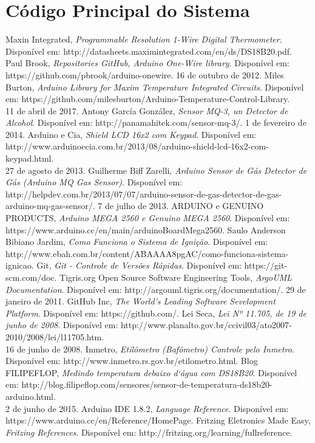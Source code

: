 \documentclass[12pt]{article}
\begin{document}
\section{Código Principal do Sistema}


\begin{thebibliography}{9}

  Maxin Integrated, \emph{Programmable Resolution 1-Wire Digital Thermometer}. Disponível em:
  http://datasheets.maximintegrated.com/en/ds/DS18B20.pdf.
  Paul Brook, \emph{Repositories GitHub, Arduino One-Wire library}. Disponível em:
  https://github.com/pbrook/arduino-onewire. 16 de outubro de 2012.
 Miles Burton, \emph{Arduino Library for Maxim Temperature Integrated Circuits}. Disponível em:
  https://github.com/milesburton/Arduino-Temperature-Control-Library.\\ 11 de abril de 2017.
  Antony García González, \emph{Sensor MQ-3, un Detector de Alcohol}. Disponível em:
  http://panamahitek.com/sensor-mq-3/. 1 de fevereiro de 2014.
  Arduino e Cia, \emph{Shield LCD 16x2 com Keypad}. Disponível em:
  http://www.arduinoecia.com.br/2013/08/arduino-shield-lcd-16x2-com-keypad.html. \\ 27 de agosto de 2013.
  Guilherme Biff Zarelli, \emph{Arduino Sensor de Gás Detector de Gás (Arduino MQ Gas Sensor)}. Disponível em:
  http://helpdev.com.br/2013/07/07/arduino-sensor-de-gas-detector-de-gas-arduino-mq-gas-sensor/. 7 de julho de 2013.
  ARDUINO e GENUINO PRODUCTS, \emph{Arduino MEGA 2560 e Genuino MEGA 2560}. Disponível em:
  https://www.arduino.cc/en/main/arduinoBoardMega2560.
  Saulo Anderson Bibiano Jardim, \emph{Como Funciona o Sistema de Ignição}. Disponível em:
  http://www.ebah.com.br/content/ABAAAA8pgAC/como-funciona-sistema-ignicao.
  Git, \emph{Git - Controle de Versões Rápidas}. Disponível em:
  https://git-scm.com/doc.
  Tigris.org Open Source Software Engineering Tools, \emph{ArgoUML Documentation}. Disponível em:
 http://argouml.tigris.org/documentation/. 29 de janeiro de 2011.
  GitHub Inc, \emph{The World's Leading Software Sevelopment Platform}. Disponível em:
 https://github.com/.
  Lei Seca, \emph{Lei Nº 11.705, de 19 de junho de 2008}. Disponível em:
 http://www.planalto.gov.br/ccivil03/ato2007-2010/2008/lei/l11705.htm.\\ 16  de junho de 2008.
 Inmetro, \emph{Etilômetro (Bafômetro) Controle pelo Inmetro}. Disponível em:
 http://www.inmetro.rs.gov.br/etilometro.html.
  Blog FILIPEFLOP, \emph{Medindo temperatura debaixo d`água com DS18B20}. Disponível em:
  http://blog.filipeflop.com/sensores/sensor-de-temperatura-ds18b20-arduino.html.\\ 2 de junho de 2015.
  Arduino IDE 1.8.2, \emph{Language Reference}. Disponível em:
  https://www.arduino.cc/en/Reference/HomePage. 
  Fritzing Eletronics Made Easy, \emph{Fritzing References}. Disponível em:
  http://fritzing.org/learning/fullreference.
\end{thebibliography}

\end{document}
